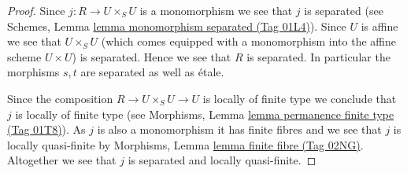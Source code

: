 \documentclass{amsart}
\theoremstyle{plain}
\theoremstyle{definition}
\theoremstyle{remark}
\numberwithin{equation}{subsection}
\begin{document}
\begin{proof}
Since $j : R \to U \times_S U$ is a monomorphism we see that $j$ is separated
(see Schemes, Lemma \href{https://stacks.math.columbia.edu/tag/01L4}{lemma monomorphism separated (Tag 01L4)}).
Since $U$ is affine we see that $U \times_S U$
(which comes equipped with a monomorphism into the affine scheme
$U \times U$) is separated. Hence we see that $R$ is separated.
In particular the morphisms $s, t$ are separated as well as \'etale.

\medskip\noindent
Since the composition $R \to U \times_S U \to U$ is
locally of finite type we conclude that
$j$ is locally of finite type (see
Morphisms, Lemma \href{https://stacks.math.columbia.edu/tag/01T8}{lemma permanence finite type (Tag 01T8)}).
As $j$ is also a monomorphism it has finite fibres and
we see that $j$ is locally quasi-finite by
Morphisms, Lemma \href{https://stacks.math.columbia.edu/tag/02NG}{lemma finite fibre (Tag 02NG)}.
Altogether we see that $j$ is separated and locally quasi-finite.


\end{proof}
\end{document}
